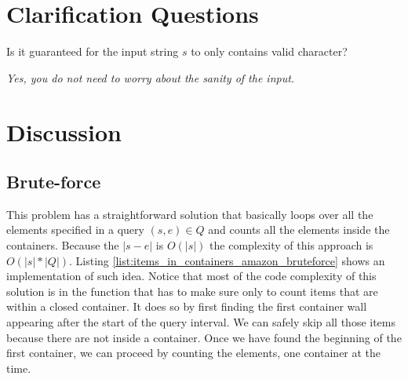 \section{Clarification Questions}

\begin{QandA}
	\item \begin{questionitem} \begin{question} Is it guaranteed for the input string $s$ to only contains valid character?  \end{question} 	 
    \begin{answered}
		\textit{Yes, you do not need to worry about the sanity of the input.}
	\end{answered} \end{questionitem}
\end{QandA}

\section{Discussion}
\label{items_in_containers_amazon:sec:discussion}



\subsection{Brute-force}
\label{items_in_containers_amazon:sec:bruteforce}
This problem has a straightforward solution that basically loops over all the elements  specified in
a query $(s,e) \in Q$ and counts all the elements inside the containers. Because the $|s-e|$ is
$O(|s|)$ the complexity of this approach is $O(|s|*|Q|)$. Listing
\ref{list:items_in_containers_amazon_bruteforce} shows an implementation of such idea. Notice that
most of the code complexity of this solution is in the  function
that has to make sure only to count items that are within a closed container. It does so by first
finding the first container wall appearing after the start of the query interval. We can safely skip
all those items because there are not inside a container. Once we have found the beginning of the
first container, we can proceed by counting the elements, one container   at the time. 


